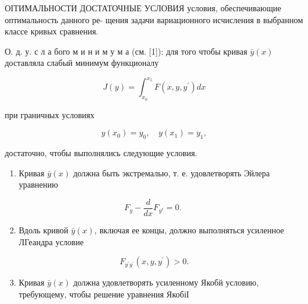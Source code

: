 \documentclass[10pt]{article}
\begin{document}
ОІТИМАЛЬНОСТИ ДОСТАТОЧНЫЕ УСЛОВИЯ условия, обеспечивающие оптимальность данного ре- щения задачи вариационного исчисления в выбранном классе кривых сравнения.



О. д. у. с л а бого м и н и м у м а (см. [1]): для того чтобы кривая $\bar{y}(x)$ доставляла слабый минимум функционалу



\[

J(y)=\int_{x_{0}}^{x_{1}} F\left(x, y, y^{\prime}\right) d x

\]



при граничных условиях



\[

y\left(x_{0}\right)=y_{0}, \quad y\left(x_{1}\right)=y_{1},

\]



достаточно, чтобы выполнялись следующие условия.



\begin{enumerate}

  \item Кривая $\bar{y}(x)$ должна быть экстремалью, т. е. удовлетворять Эйлера уравнению

\end{enumerate}



\[

F_{y}-\frac{d}{d x} F_{y^{\ell}}=0 \text {. }

\]



\begin{enumerate}

  \setcounter{enumi}{1}

  \item Вдоль кривой $\bar{y}(x)$, включая ее концы, должно выполняться усиленное ЛГеандра условие

\end{enumerate}



\[

F_{y^{\prime} y^{\prime}}\left(x, y, y^{\prime}\right)>0 .

\]



\begin{enumerate}

  \setcounter{enumi}{2}

  \item Кривая $\bar{y}(x)$ должна удовлетворять усиленному Якобй условию, требующему, чтобы решение уравнения ЯкобіІ

\end{enumerate}
\end{document}
